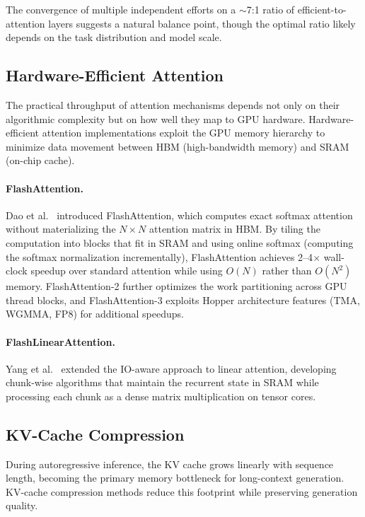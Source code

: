 The convergence of multiple independent efforts on a ${\sim}$7:1 ratio of efficient-to-attention layers suggests a natural balance point, though the optimal ratio likely depends on the task distribution and model scale.

\subsection{Hardware-Efficient Attention}
\label{subsec:hw-attn}

The practical throughput of attention mechanisms depends not only on their algorithmic complexity but on how well they map to GPU hardware. Hardware-efficient attention implementations exploit the GPU memory hierarchy to minimize data movement between HBM (high-bandwidth memory) and SRAM (on-chip cache).

\paragraph{FlashAttention.}
Dao et al.~\cite{dao2022flashattention} introduced FlashAttention, which computes exact softmax attention without materializing the $N \times N$ attention matrix in HBM. By tiling the computation into blocks that fit in SRAM and using online softmax (computing the softmax normalization incrementally), FlashAttention achieves 2--4$\times$ wall-clock speedup over standard attention while using $O(N)$ rather than $O(N^2)$ memory. FlashAttention-2 further optimizes the work partitioning across GPU thread blocks, and FlashAttention-3 exploits Hopper architecture features (TMA, WGMMA, FP8) for additional speedups.

\paragraph{FlashLinearAttention.}
Yang et al.~\cite{yang2024gla} extended the IO-aware approach to linear attention, developing chunk-wise algorithms that maintain the recurrent state in SRAM while processing each chunk as a dense matrix multiplication on tensor cores.

\subsection{KV-Cache Compression}
\label{subsec:kv-compress}

During autoregressive inference, the KV cache grows linearly with sequence length, becoming the primary memory bottleneck for long-context generation. KV-cache compression methods reduce this footprint while preserving generation quality.

